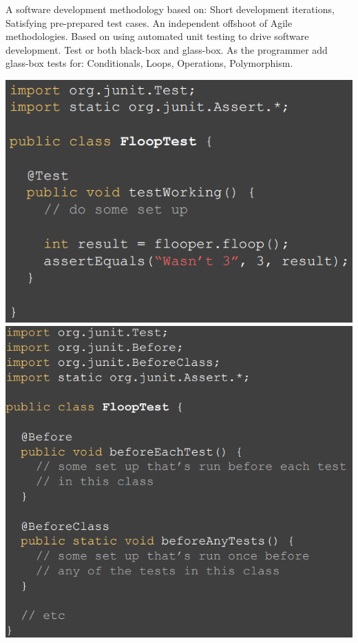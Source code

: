\documentclass[number]{assignment}
\begin{document}
\begin{landscape}
\begin{multicols}{3}
\small A software development methodology based on: Short development iterations, Satisfying pre-prepared test cases. An independent offshoot of Agile methodologies. Based on using automated unit testing to drive software development.
\small Test or both black-box and glass-box. As the programmer add glass-box tests for: Conditionals, Loops, Operations, Polymorphism.
\begin{multicols}{2}
\includegraphics[width=\linewidth]{test1.png}
\includegraphics[width=\linewidth]{test2.png}
\end{multicols}

\end{multicols}
\end{landscape}
\end{document}
